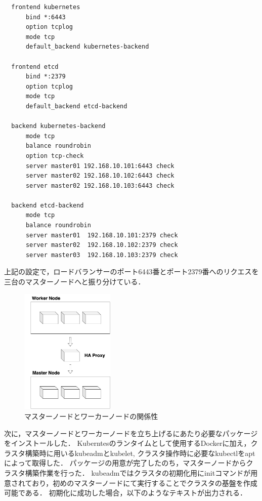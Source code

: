 \begin{lstlisting}
  frontend kubernetes
      bind *:6443
      option tcplog
      mode tcp
      default_backend kubernetes-backend

  frontend etcd
      bind *:2379
      option tcplog
      mode tcp
      default_backend etcd-backend

  backend kubernetes-backend
      mode tcp
      balance roundrobin
      option tcp-check
      server master01 192.168.10.101:6443 check
      server master02 192.168.10.102:6443 check
      server master02 192.168.10.103:6443 check

  backend etcd-backend
      mode tcp
      balance roundrobin
      server master01  192.168.10.101:2379 check
      server master02  192.168.10.102:2379 check
      server master03  192.168.10.103:2379 check
\end{lstlisting}

上記の設定で，ロードバランサーのポート6443番とポート2379番へのリクエスを三台のマスターノードへと振り分けている．

\begin{figure}[htbp]
  \begin{center}
    \includegraphics[width=0.4\textwidth]{./figures/haproxy.jpg}
    \caption{マスターノードとワーカーノードの関係性}
  \end{center}
\end{figure}

次に，マスターノードとワーカーノードを立ち上げるにあたり必要なパッケージをインストールした．
Kuberntesのランタイムとして使用するDockerに加え，クラスタ構築時に用いるkubeadmとkubelet, クラスタ操作時に必要なkubectlをaptによって取得した．
パッケージの用意が完了したのち，マスターノードからクラスタ構築作業を行った．
kubeadmではクラスタの初期化用にinitコマンドが用意されており，初めのマスターノードにて実行することでクラスタの基盤を作成可能である．
初期化に成功した場合，以下のようなテキストが出力される．\\


